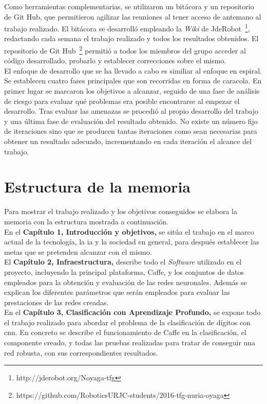 Como herramientas complementarias, se utilizaron un bitácora y un repositorio de Git Hub, que permitieron agilizar las reuniones al tener acceso de antemano al trabajo realizado. El bitácora se desarrolló empleando la \textit{Wiki} de JdeRobot~\footnote{http://jderobot.org/Noyaga-tfg}, redactando cada semana el trabajo realizado y todos los resultados obtenidos. El repositorio de Git Hub~\footnote{https://github.com/RoboticsURJC-students/2016-tfg-nuria-oyaga} permitió a todos los miembros del grupo acceder al código desarrollado, probarlo y establecer correcciones sobre el mismo.\\

El enfoque de desarrollo que se ha llevado a cabo es similiar al enfoque en espiral. Se establecen cuatro fases principales que son recorridas en forma de caracola. En primer lugar se marcaron los objetivos a alcanzar, seguido de una fase de análisis de riesgo para evaluar qué problemas era posible encontrarse al empezar el desarrollo. Tras evaluar las amenazas se procedió al propio desarrollo del trabajo y una última fase de evaluación del resultado obtenido. No existe un número fijo de iteraciones sino que se producen tantas iteraciones como sean necesarias para obtener un resultado adecuado, incrementando en cada iteración el alcance del trabajo.

\section{Estructura de la memoria}
Para mostrar el trabajo realizado y los objetivos conseguidos se elabora la memoria con la estructura mostrada a continuación.\\

En el \textbf{Capítulo 1, Introducción y objetivos,} se sitúa el trabajo en el marco actual de la tecnología, la \acrshort{ia} y la sociedad en general, para después establecer las metas que se pretenden alcanzar con el mismo.\\

El \textbf{Capítulo 2, Infraestructura,} describe todo el \textit{Software} utilizado en el proyecto, incluyendo la principal plataforma, Caffe, y los conjuntos de datos empleados para la obtención y evaluación de las redes neuronales. Además se explican los diferentes parámetros que serán empleados para evaluar las prestaciones de las redes creadas.\\

En el \textbf{Capítulo 3, Clasificación con Aprendizaje Profundo,} se expone todo el trabajo realizado para abordar el problema de la clasificación de dígitos con \acrshort{cnn}. En concreto se describe el funcionamiento de Caffe en la clasificación, el componente creado, y todas las pruebas realizadas para tratar de conseguir una red robusta, con sus correspondientes resultados.\\

